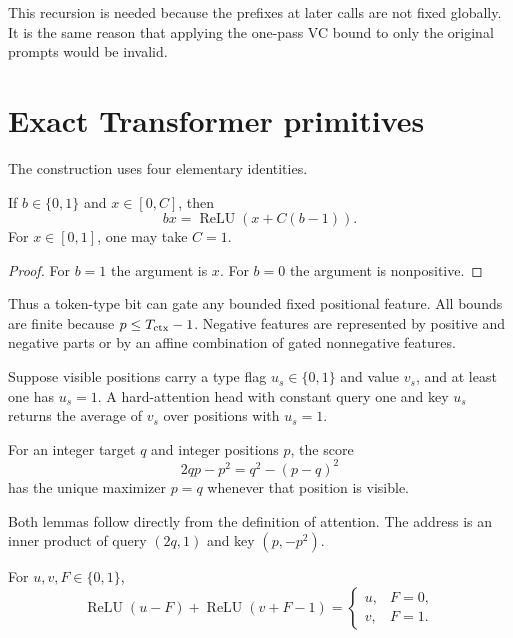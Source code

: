 This recursion is needed because the prefixes at later calls are not fixed globally. It is the same
reason that applying the one-pass VC bound to only the original prompts would be invalid.

\section{Exact Transformer primitives}\label{app:primitives}

The construction uses four elementary identities.

\begin{lemma}\label{lem:gate}
If $b\in\{0,1\}$ and $x\in[0,C]$, then
\[
 bx=\operatorname{ReLU}(x+C(b-1)).
 \tag{B.1}
\]
For $x\in[0,1]$, one may take $C=1$.
\end{lemma}

\begin{proof}
For $b=1$ the argument is $x$. For $b=0$ the argument is nonpositive.
\end{proof}

Thus a token-type bit can gate any bounded fixed positional feature. All bounds are finite because
$p\leq T_{\rm ctx}-1$. Negative features are represented by positive and negative parts or by an
affine combination of gated nonnegative features.

\begin{lemma}\label{lem:average}
Suppose visible positions carry a type flag $u_s\in\{0,1\}$ and value $v_s$, and at least one has
$u_s=1$. A hard-attention head with constant query one and key $u_s$ returns the average of $v_s$
over positions with $u_s=1$.
\end{lemma}

\begin{lemma}\label{lem:address}
For an integer target $q$ and integer positions $p$, the score
\[
 2qp-p^2=q^2-(p-q)^2
 \tag{B.2}
\]
has the unique maximizer $p=q$ whenever that position is visible.
\end{lemma}

Both lemmas follow directly from the definition of attention. The address is an inner product of
query $(2q,1)$ and key $(p,-p^2)$.

\begin{lemma}\label{lem:selector}
For $u,v,F\in\{0,1\}$,
\[
 \operatorname{ReLU}(u-F)+\operatorname{ReLU}(v+F-1)
 =\begin{cases}u,&F=0,\\v,&F=1.\end{cases}
 \tag{B.3}
\]
\end{lemma}

